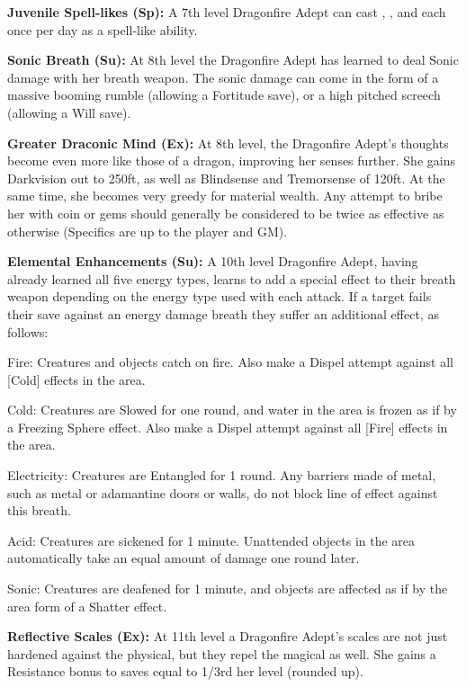 \textbf{Juvenile Spell-likes (Sp):} A 7th level Dragonfire Adept can cast , , and  each once per day as a spell-like ability.

\textbf{Sonic Breath (Su):} At 8th level the Dragonfire Adept has learned to deal Sonic damage with her breath weapon. The sonic damage can come in the form of a massive booming rumble (allowing a Fortitude save), or a high pitched screech (allowing a Will save).

\textbf{Greater Draconic Mind (Ex):} At 8th level, the Dragonfire Adept's thoughts become even more like those of a dragon, improving her senses further. She gains Darkvision out to 250ft, as well as Blindsense and Tremorsense of 120ft. At the same time, she becomes very greedy for material wealth. Any attempt to bribe her with coin or gems should generally be considered to be twice as effective as otherwise (Specifics are up to the player and GM).

\textbf{Elemental Enhancements (Su):} A 10th level Dragonfire Adept, having already learned all five energy types, learns to add a special effect to their breath weapon depending on the energy type used with each attack. If a target fails their save against an energy damage breath they suffer an additional effect, as follows:

\begin{itemize*}
\item Fire: Creatures and objects catch on fire. Also make a Dispel attempt against all [Cold] effects in the area.
\item Cold: Creatures are Slowed for one round, and water in the area is frozen as if by a Freezing Sphere effect. Also make a Dispel attempt against all [Fire] effects in the area.
\item Electricity: Creatures are Entangled for 1 round. Any barriers made of metal, such as metal or adamantine doors or walls, do not block line of effect against this breath.
\item Acid: Creatures are sickened for 1 minute. Unattended objects in the area automatically take an equal amount of damage one round later.
\item Sonic: Creatures are deafened for 1 minute, and objects are affected as if by the area form of a Shatter effect.
\end{itemize*}

\textbf{Reflective Scales (Ex):} At 11th level a Dragonfire Adept's scales are not just hardened against the physical, but they repel the magical as well. She gains a Resistance bonus to saves equal to 1/3rd her level (rounded up).

